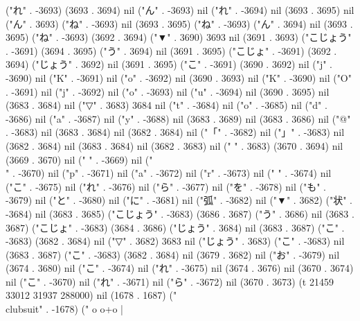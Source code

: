{("れ" . -3693) (3693 . 3694) nil ("ん" . -3693) nil ("れ" . -3694) nil (3693 . 3695) nil ("ん" . 3693) ("ね" . -3693) nil (3693 . 3695) ("ね" . -3693) ("ん" . 3694) nil (3693 . 3695) ("ね" . -3693) (3692 . 3694) ("▼" . 3690) 3693 nil (3691 . 3693) ("こじょう" . -3691) (3694 . 3695) ("う" . 3694) nil (3691 . 3695) ("こじょ" . -3691) (3692 . 3694) ("じょう" . 3692) nil (3691 . 3695) ("こ" . -3691) (3690 . 3692) nil ("j" . -3690) nil ("K" . -3691) nil ("o" . -3692) nil (3690 . 3693) nil ("K" . -3690) nil ("O" . -3691) nil ("j" . -3692) nil ("o" . -3693) nil ("u" . -3694) nil (3690 . 3695) nil (3683 . 3684) nil ("▽" . 3683) 3684 nil ("t" . -3684) nil ("o" . -3685) nil ("d" . -3686) nil ("a" . -3687) nil ("y" . -3688) nil (3683 . 3689) nil (3683 . 3686) nil ("@" . -3683) nil (3683 . 3684) nil (3682 . 3684) nil ("「" . -3682) nil ("」" . -3683) nil (3682 . 3684) nil (3683 . 3684) nil (3682 . 3683) nil (" " . 3683) (3670 . 3694) nil (3669 . 3670) nil ("
" . -3669) nil ("\\" . -3670) nil ("p" . -3671) nil ("a" . -3672) nil ("r" . -3673) nil (" " . -3674) nil ("こ" . -3675) nil ("れ" . -3676) nil ("ら" . -3677) nil ("を" . -3678) nil ("も" . -3679) nil ("と" . -3680) nil ("に" . -3681) nil ("弧" . -3682) nil ("▼" . 3682) ("状" . -3684) nil (3683 . 3685) ("こじょう" . -3683) (3686 . 3687) ("う" . 3686) nil (3683 . 3687) ("こじょ" . -3683) (3684 . 3686) ("じょう" . 3684) nil (3683 . 3687) ("こ" . -3683) (3682 . 3684) nil ("▽" . 3682) 3683 nil ("じょう" . 3683) ("こ" . -3683) nil (3683 . 3687) ("こ" . -3683) (3682 . 3684) nil (3679 . 3682) nil ("お" . -3679) nil (3674 . 3680) nil ("こ" . -3674) nil ("れ" . -3675) nil (3674 . 3676) nil (3670 . 3674) nil ("こ" . -3670) nil ("れ" . -3671) nil ("ら" . -3672) nil (3670 . 3673) (t 21459 33012 31937 288000) nil (1678 . 1687) ("\\clubsuit" . -1678) (" o
o+o
 |
}
